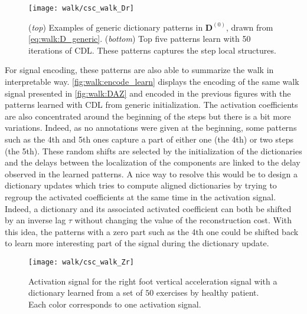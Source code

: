 \documentclass[../thesis.tex]{subfiles}
\begin{document}
{\begin{figure}[tp]
\centering
\texttt{[image: walk/csc\_walk\_Dr]}
\caption{(\emph{top}) Examples of generic dictionary patterns in $\pmb D^{(0)}$, drawn from \autoref{eq:walk:D_generic}. (\emph{bottom}) Top five patterns learn with 50 iterations of CDL. These patterns captures the step local structures.}
\label{fig:walk:dict_generic}
\end{figure}


For signal encoding, these patterns are also able to summarize the walk in interpretable way. \autoref{fig:walk:encode_learn} displays the encoding of the same walk signal presented in \autoref{fig:walk:DAZ} and encoded in the previous figures with the patterns learned with CDL from generic initialization. The activation coefficients are also concentrated around the beginning of the steps but there is a bit more variations. Indeed, as no annotations were given at the beginning, some patterns such as the 4th and 5th ones  capture a part of either one (the 4th) or two steps (the 5th). These random shifts are selected by the initialization of the dictionaries and the delays between the localization of the components are linked to the delay observed in the learned patterns. A nice way to resolve this would be to design a dictionary updates which tries to compute aligned dictionaries by trying to regroup the activated coefficients at the same time in the activation signal. Indeed, a dictionary and its associated activated coefficient can both be shifted by an inverse lag $\tau$ without changing the value of the reconstruction cost. With this idea, the patterns with a zero part such as the 4th one could be shifted back to learn more interesting part of the signal during the dictionary update.

\begin{figure}[tp]
	\centering
	\texttt{[image: walk/csc\_walk\_Zr]}
	\caption{Activation signal for the right foot vertical acceleration signal with a dictionary learned from
			 a set of $50$ exercises by healthy patient. Each color corresponds to one activation signal.}
	\label{fig:walk:encode_learn}
\end{figure}


}
\end{document}

